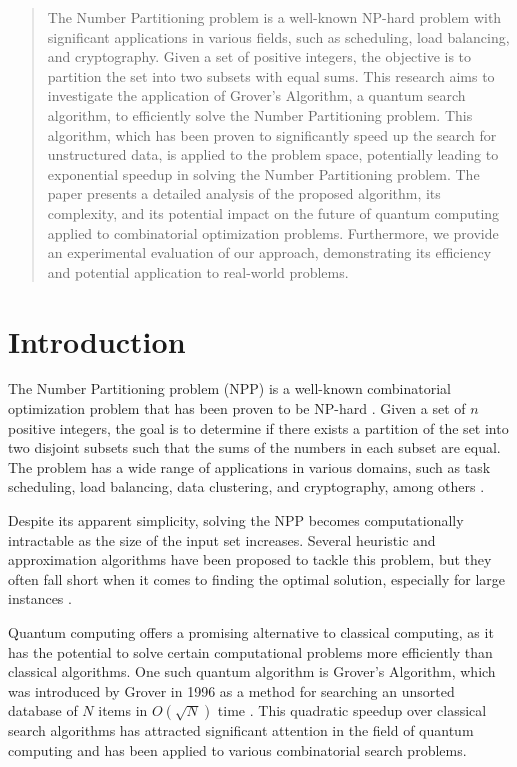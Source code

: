\begin{abstract}

The Number Partitioning problem is a well-known NP-hard problem with significant applications in various fields, such as scheduling, load balancing, and cryptography. Given a set of positive integers, the objective is to partition the set into two subsets with equal sums. This research aims to investigate the application of Grover's Algorithm, a quantum search algorithm, to efficiently solve the Number Partitioning problem. This algorithm, which has been proven to significantly speed up the search for unstructured data, is applied to the problem space, potentially leading to exponential speedup in solving the Number Partitioning problem. The paper presents a detailed analysis of the proposed algorithm, its complexity, and its potential impact on the future of quantum computing applied to combinatorial optimization problems. Furthermore, we provide an experimental evaluation of our approach, demonstrating its efficiency and potential application to real-world problems.

\end{abstract}

\section{Introduction}

The Number Partitioning problem (NPP) is a well-known combinatorial optimization problem that has been proven to be NP-hard \cite{Garey1979}. Given a set of $n$ positive integers, the goal is to determine if there exists a partition of the set into two disjoint subsets such that the sums of the numbers in each subset are equal. The problem has a wide range of applications in various domains, such as task scheduling, load balancing, data clustering, and cryptography, among others \cite{Mertens2004}.

Despite its apparent simplicity, solving the NPP becomes computationally intractable as the size of the input set increases. Several heuristic and approximation algorithms have been proposed to tackle this problem, but they often fall short when it comes to finding the optimal solution, especially for large instances \cite{Korf1995}.

Quantum computing offers a promising alternative to classical computing, as it has the potential to solve certain computational problems more efficiently than classical algorithms. One such quantum algorithm is Grover's Algorithm, which was introduced by Grover in 1996 as a method for searching an unsorted database of $N$ items in $O(\sqrt{N})$ time \cite{Grover1996}. This quadratic speedup over classical search algorithms has attracted significant attention in the field of quantum computing and has been applied to various combinatorial search problems.

